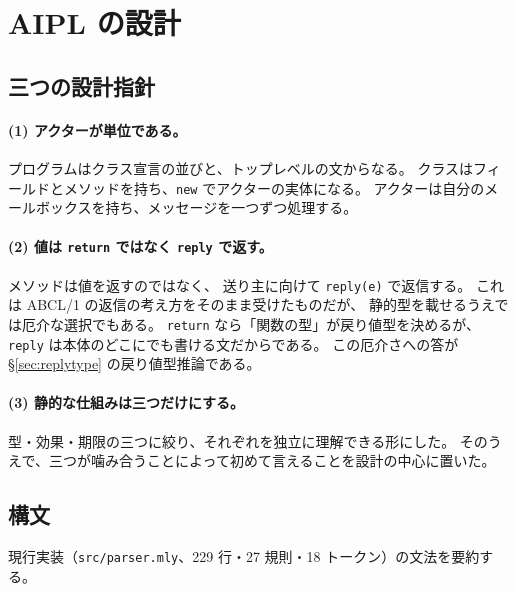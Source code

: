 \documentclass[11pt,a4paper]{ltjsarticle}
\theoremstyle{definition}
\theoremstyle{remark}
\begin{document}
\section{AIPL の設計}
\label{sec:design}

\subsection{三つの設計指針}

\paragraph{(1) アクターが単位である。}
プログラムはクラス宣言の並びと、トップレベルの文からなる。
クラスはフィールドとメソッドを持ち、\texttt{new} でアクターの実体になる。
アクターは自分のメールボックスを持ち、メッセージを一つずつ処理する。

\paragraph{(2) 値は \texttt{return} ではなく \texttt{reply} で返す。}
メソッドは値を返すのではなく、
送り主に向けて \texttt{reply(e)} で返信する。
これは ABCL/1 の返信の考え方をそのまま受けたものだが、
静的型を載せるうえでは厄介な選択でもある。
\texttt{return} なら「関数の型」が戻り値型を決めるが、
\texttt{reply} は本体のどこにでも書ける文だからである。
この厄介さへの答が \S\ref{sec:replytype} の戻り値型推論である。

\paragraph{(3) 静的な仕組みは三つだけにする。}
型・効果・期限の三つに絞り、それぞれを独立に理解できる形にした。
そのうえで、三つが噛み合うことによって初めて言えることを設計の中心に置いた。

\subsection{構文}

現行実装（\texttt{src/parser.mly}、229 行・27 規則・18 トークン）の文法を要約する。
\end{document}
